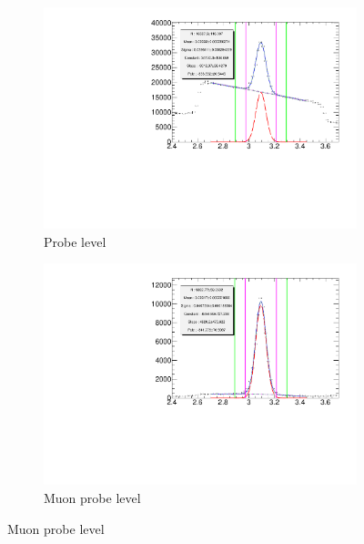\begin{figure}[thbp]
  \centering
  \begin{subfigure}[b]{0.54\textwidth}
  \includegraphics[width=\textwidth]{PartCalibration2012/Plots/Kinematics/Data_InvMass_pt_5_6_barrel_probe.pdf}
    \caption{Probe level}
  \end{subfigure}

  \begin{subfigure}[b]{0.54\textwidth}
    \includegraphics[width=\textwidth]{PartCalibration2012/Plots/Kinematics/Data_InvMass_pt_5_6_barrel_muonprobe.pdf}
    \caption{Muon probe level}   
  \end{subfigure}


\end{figure}
